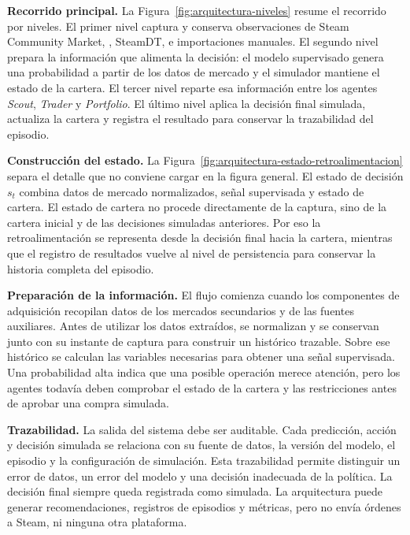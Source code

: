 \textbf{Recorrido principal.} La Figura~\ref{fig:arquitectura-niveles} resume el recorrido por niveles. El primer nivel captura y conserva observaciones de Steam Community Market, , SteamDT,  e importaciones manuales. El segundo nivel prepara la información que alimenta la decisión: el modelo supervisado genera una probabilidad a partir de los datos de mercado y el simulador mantiene el estado de la cartera. El tercer nivel reparte esa información entre los agentes \textit{Scout}, \textit{Trader} y \textit{Portfolio}. El último nivel aplica la decisión final simulada, actualiza la cartera y registra el resultado para conservar la trazabilidad del episodio.

\textbf{Construcción del estado.} La Figura~\ref{fig:arquitectura-estado-retroalimentacion} separa el detalle que no conviene cargar en la figura general. El estado de decisión $s_t$ combina datos de mercado normalizados, señal supervisada y estado de cartera. El estado de cartera no procede directamente de la captura, sino de la cartera inicial y de las decisiones simuladas anteriores. Por eso la retroalimentación se representa desde la decisión final hacia la cartera, mientras que el registro de resultados vuelve al nivel de persistencia para conservar la historia completa del episodio.

\clearpage

\textbf{Preparación de la información.} El flujo comienza cuando los componentes de adquisición recopilan datos de los mercados secundarios y de las fuentes auxiliares. Antes de utilizar los datos extraídos, se normalizan y se conservan junto con su instante de captura para construir un histórico trazable. Sobre ese histórico se calculan las variables necesarias para obtener una señal supervisada. Una probabilidad alta indica que una posible operación merece atención, pero los agentes todavía deben comprobar el estado de la cartera y las restricciones antes de aprobar una compra simulada.

\textbf{Trazabilidad.} La salida del sistema debe ser auditable. Cada predicción, acción y decisión simulada se relaciona con su fuente de datos, la versión del modelo, el episodio y la configuración de simulación. Esta trazabilidad permite distinguir un error de datos, un error del modelo y una decisión inadecuada de la política. La decisión final siempre queda registrada como simulada. La arquitectura puede generar recomendaciones, registros de episodios y métricas, pero no envía órdenes a Steam,  ni ninguna otra plataforma.

